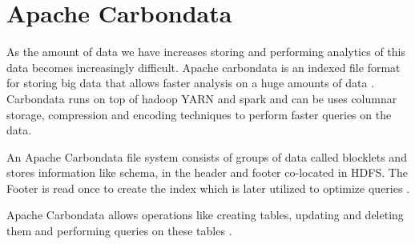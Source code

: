 \section{Apache Carbondata}


As the amount of data we have increases storing and performing
analytics of this data becomes increasingly difficult.
Apache carbondata is an indexed file format for storing big data
that allows faster analysis on a huge amounts of data
\cite{hid-sp18-503-carbondata-docs}. Carbondata runs on top of hadoop YARN
and spark and can be uses columnar storage, compression and
encoding techniques to perform faster queries on the data.

An Apache Carbondata file system consists of groups of data called blocklets
and stores information like schema, in the header and footer co-located in HDFS.
The Footer is read once to create the index which is later utilized to
optimize queries \cite{hid-sp18-503-carbondata-docs}.

Apache Carbondata allows operations like creating tables, updating and
deleting them and performing queries on these tables
\cite{hid-sp18-503-carbondata-mgmt}.



